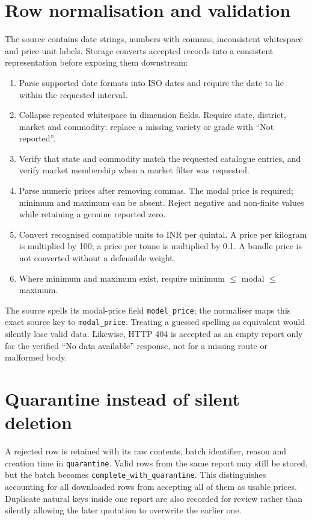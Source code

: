 \documentclass[12pt,a4paper,oneside]{report}
\numberwithin{equation}{chapter}
\numberwithin{figure}{chapter}
\numberwithin{table}{chapter}
\theoremstyle{definition}
\begin{document}
\section{Row normalisation and validation}
The source contains date strings, numbers with commas, inconsistent whitespace and price-unit labels. Storage converts accepted records into a consistent representation before exposing them downstream:
\begin{enumerate}
  \item Parse supported date formats into ISO dates and require the date to lie within the requested interval.
  \item Collapse repeated whitespace in dimension fields. Require state, district, market and commodity; replace a missing variety or grade with ``Not reported''.
  \item Verify that state and commodity match the requested catalogue entries, and verify market membership when a market filter was requested.
  \item Parse numeric prices after removing commas. The modal price is required; minimum and maximum can be absent. Reject negative and non-finite values while retaining a genuine reported zero.
  \item Convert recognised compatible units to INR per quintal. A price per kilogram is multiplied by 100; a price per tonne is multiplied by 0.1. A bundle price is not converted without a defensible weight.
  \item Where minimum and maximum exist, require minimum $\le$ modal $\le$ maximum.
\end{enumerate}

The source spells its modal-price field \texttt{model\_price}; the normaliser maps this exact source key to \texttt{modal\_price}. Treating a guessed spelling as equivalent would silently lose valid data. Likewise, HTTP 404 is accepted as an empty report only for the verified ``No data available'' response, not for a missing route or malformed body.

\section{Quarantine instead of silent deletion}
A rejected row is retained with its raw contents, batch identifier, reason and creation time in \texttt{quarantine}. Valid rows from the same report may still be stored, but the batch becomes \texttt{complete\_with\_quarantine}. This distinguishes accounting for all downloaded rows from accepting all of them as usable prices. Duplicate natural keys inside one report are also recorded for review rather than silently allowing the later quotation to overwrite the earlier one.
\end{document}
